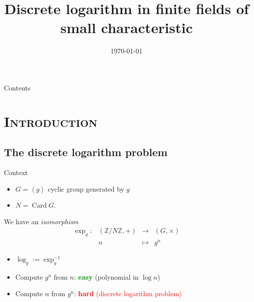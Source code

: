 \documentclass[xcolor=x11names,compress]{beamer}
\theoremstyle{break}
\theoremstyle{sc}
\theoremstyle{definition}
\theoremstyle{remark}
\DeclareMathOperator{\Card}{Card}
\begin{document}
\begin{frame}
  \title{Discrete logarithm in finite fields of small characteristic}
  \author{}
\date{\today}
\titlepage
\end{frame}

\begin{frame}{Contents}
  \tableofcontents[hideallsubsections]
\end{frame}

\section{\scshape Introduction}
\subsection{The discrete logarithm problem}
\begin{frame}{Context}
  \begin{itemize}
    \item $G=\left\langle g \right\rangle$ cyclic group generated by $g$
    \item $N=\Card G$.
    \end{itemize}
  
  We have an \emph{isomorphism}
  \[
    \begin{array}{cccc}
      \exp_g: & (\mathbb{Z}/N\mathbb{Z},+) & \to & (G,\times) \\
      & n & \mapsto & g^n
    \end{array}
  \]

  \begin{itemize}
    \item $\log_g:=\exp_g^{-1}$
   \item Compute $g^n$ from $n$: \textcolor{green}{\bf easy} (polynomial in
     $\log n$)
    \item Compute $n$ from $g^n$: \textcolor{red}{\textbf{hard} (discrete
    logarithm problem)}
  \end{itemize}
\end{frame}
\end{document}
